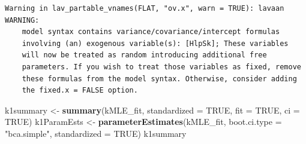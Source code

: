 \documentclass[
  11pt,
]{book}
\newenvironment{Shaded}{\begin{snugshade}}{\end{snugshade}}
\newcommand{\AttributeTok}[1]{\textcolor[rgb]{0.27,0.27,0.27}{#1}}
\newcommand{\ConstantTok}[1]{\textcolor[rgb]{0.37,0.37,0.37}{#1}}
\newcommand{\FunctionTok}[1]{\textcolor[rgb]{0.27,0.27,0.27}{\textbf{#1}}}
\newcommand{\NormalTok}[1]{#1}
\newcommand{\OtherTok}[1]{\textcolor[rgb]{0.37,0.37,0.37}{#1}}
\newcommand{\StringTok}[1]{\textcolor[rgb]{0.5,0.5,0.5}{#1}}
\begin{document}
\begin{verbatim}
Warning in lav_partable_vnames(FLAT, "ov.x", warn = TRUE): lavaan WARNING:
    model syntax contains variance/covariance/intercept formulas
    involving (an) exogenous variable(s): [HlpSk]; These variables
    will now be treated as random introducing additional free
    parameters. If you wish to treat those variables as fixed, remove
    these formulas from the model syntax. Otherwise, consider adding
    the fixed.x = FALSE option.
\end{verbatim}

\begin{Shaded}
\begin{Highlighting}[]
\NormalTok{k1summary }\OtherTok{\textless{}{-}} \FunctionTok{summary}\NormalTok{(kMLE\_fit, }\AttributeTok{standardized =} \ConstantTok{TRUE}\NormalTok{, }\AttributeTok{fit =} \ConstantTok{TRUE}\NormalTok{, }\AttributeTok{ci =} \ConstantTok{TRUE}\NormalTok{)}
\NormalTok{k1ParamEsts }\OtherTok{\textless{}{-}} \FunctionTok{parameterEstimates}\NormalTok{(kMLE\_fit, }\AttributeTok{boot.ci.type =} \StringTok{"bca.simple"}\NormalTok{,}
    \AttributeTok{standardized =} \ConstantTok{TRUE}\NormalTok{)}
\NormalTok{k1summary}
\end{Highlighting}
\end{Shaded}
\end{document}
